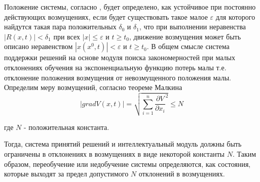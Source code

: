 Положение системы, согласно \cite{Tau}, будет определено, как устойчивое при постоянно действующих возмущениях, если будет существовать такое малое $\varepsilon$ для которого найдутся такая пара положительных $\delta_0$ и $\delta_1$, что при выполнении неравенства $|R(x,t)| < \delta_1$ при всех $|x|\leq \varepsilon$ и $t \geq t_0$, движение возмущения может быть описано неравенством $|x(x^0, t)| < \varepsilon$ и $t \geq t_0$.
В общем смысле система поддержки решений на основе модуля поиска закономерностей при малых отклонениях обучения на экспоненциальную функцию потерь малы т.е. отклонение положения возмущения от невозмущенного положения малы. Определим меру возмущений, согласно теореме Малкина \cite{Tau}
\begin{equation}
    \label{eq:equation48}
    |grad V(x,t)| = \sqrt{\sum_{i=1}^n{\frac{\partial V}{\partial x_i}}^2} \leq N
\end{equation}

где $N$ - положительная константа.

Тогда, система принятий решений и интеллектуальный модуль должны быть ограничены в отклонениях в возмущениях в виде некоторой константы $N$. Таким образом, переобучение или недобучение системы определяются, как состояния, которые выходят за предел допустимого $N$ отклонений в возмущениях.

